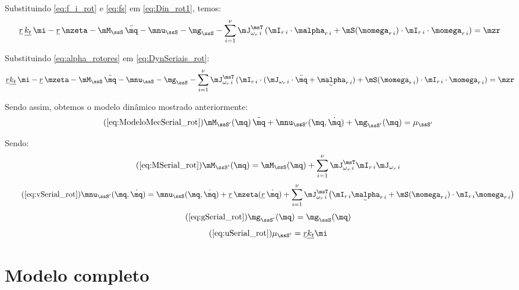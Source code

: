 \documentclass[]{politex}
\begin{document}
Substituindo \eqref{eq:f_i_rot} e \eqref{eq:fs} em  \eqref{eq:Din_rot1}, temos:
\begin{equation} \label{eq:DynSeriais_rot}
\underline{r} \, \underline{k_t} \, \mi - \underline{r} \, \mzeta - \mM_\ssS \, \ddot{\mq} - \mnu_\ssS - \mg_\ssS  - \sum_{i=1}^\nu \mJ_{\omega_r \,i}^\msT \, ( \mI_{r\,i} \cdot \malpha_{r\,i} + \mS( \momega_{r\,i} ) \cdot  \mI_{r\,i} \cdot \momega_{r\,i})    = \mzr
\end{equation}

Substituindo \eqref{eq:alpha_rotores} em \eqref{eq:DynSeriais_rot}:
\begin{equation} \label{eq:DynSeriais_rot2}
\underline{r} \underline{k_t} \, \mi - \underline{r} \, \mzeta  - \mM_\ssS \, \ddot{\mq} - \mnu_\ssS - \mg_\ssS  - \sum_{i=1}^\nu \mJ_{\omega_r \,i}^\msT \, ( \mI_{r\,i} \cdot (\mJ_{\omega_r \,i}  \cdot \ddot{\mq} + \underaccent{\sim}{\malpha}_{r\,i}  ) + \mS( \momega_{r\,i} ) \cdot \mI_{r\,i} \cdot \momega_{r\,i}  )  = \mzr
\end{equation}

Sendo assim, obtemos o modelo dinâmico mostrado anteriormente:
\begin{equation} \tag{\ref{eq:ModeloMecSerial_rot}}
\mM_{\ssS'}(\mq)  \,\ddot{\mq} + \mnu_{\ssS'}(\mq,\dot{\mq}) + \mg_{\ssS'}(\mq) = \mu_{\ssS'}
\end{equation}

Sendo:
\begin{equation} \tag{\ref{eq:MSerial_rot}}
\mM_{\ssS'}(\mq) = \mM_\ssS(\mq) + \sum_{i=1}^\nu \mJ_{\omega_r \,i}^\msT \mI_{r\,i} \mJ_{\omega_r \,i}
\end{equation}
\begin{equation} \tag{\ref{eq:vSerial_rot}}
\mnu_{\ssS'}(\mq, \dot{\mq}) = \mnu_\ssS(\mq, \dot{\mq}) + \underline{r} \, \mzeta(\underline{r} \, \dot{\mq}) + \sum_{i=1}^\nu
 \mJ_{\omega_r \,i}^\msT \big( \mI_{r\,i} \underaccent{\sim}{\malpha}_{r\,i} + \mS( \momega_{r\,i} ) \cdot \mI_{r\,i} \momega_{r\,i} \big)
\end{equation}
\begin{equation} \tag{\ref{eq:gSerial_rot}}
\mg_{\ssS'}(\mq) = \mg_\ssS(\mq)
\end{equation}
\begin{equation} \tag{\ref{eq:uSerial_rot}}
\mu_{\ssS'} = \underline{r} \underline{k_t} \mi
\end{equation}

\section{Modelo completo}
\end{document}
